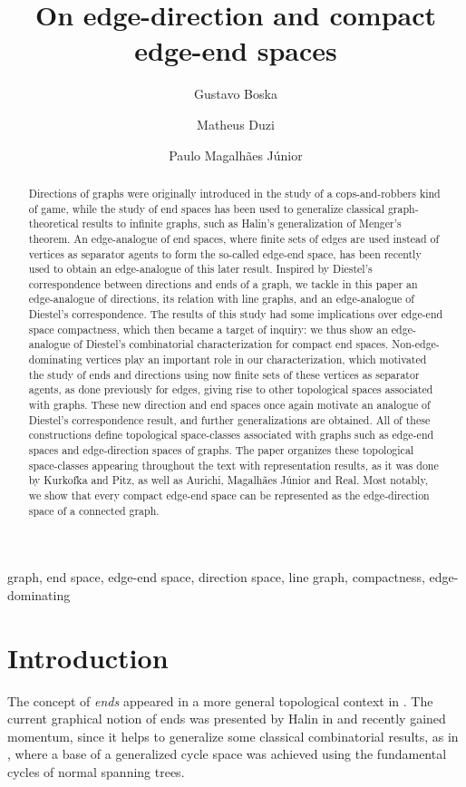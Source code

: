 \documentclass[10pt]{article}
\title{On edge-direction and compact edge-end spaces}
\author{Gustavo Boska \and Matheus Duzi \and Paulo Magalhães Júnior}
\numberwithin{equation}{subsection}
\theoremstyle{remark}
\begin{document}
    
\maketitle
    \begin{abstract}
    
    Directions of graphs were originally introduced in the study of a cops-and-robbers kind of game, while the study of end spaces has been used to generalize classical graph-theoretical results to infinite graphs, such as Halin's generalization of Menger's theorem. An edge-analogue of end spaces, where finite sets of edges are used instead of vertices as separator agents to form the so-called edge-end space, has been recently used to obtain an edge-analogue of this later result. Inspired by Diestel's correspondence between directions and ends of a graph, we tackle in this paper an edge-analogue of directions, its relation with line graphs, and an edge-analogue of Diestel's correspondence. The results of this study had some implications over edge-end space compactness, which then became a target of inquiry: we thus show an edge-analogue of Diestel's combinatorial characterization for compact end spaces. Non-edge-dominating vertices play an important role in our characterization, which motivated the study of ends and directions using now finite sets of these vertices as separator agents, as done previously for edges, giving rise to other topological spaces associated with graphs. These new direction and end spaces once again motivate an analogue of Diestel's correspondence result, and further generalizations are obtained. All of these constructions define topological space-classes associated with graphs such as edge-end spaces and edge-direction spaces of graphs. The paper organizes these topological space-classes appearing throughout the text with representation results, as it was done by Kurkofka and Pitz, as well as Aurichi, Magalhães Júnior and Real. Most notably, we show that every compact edge-end space can be represented as the edge-direction space of a connected graph.

     
    \end{abstract}

    \begin{keywords}
        graph,
        end space,
        edge-end space,
        direction space,
        line graph,
        compactness,
        edge-dominating
    \end{keywords}

    \section{Introduction}
The concept of \emph{ends} appeared in a more general topological context in \cite{Freudenthal1931}. The current graphical notion of ends was presented by Halin in \cite{Halinend} and recently gained momentum, since it helps to generalize some classical combinatorial results, as in \cite{Diestel2004}, where a base of a generalized cycle space was achieved using the fundamental cycles of normal spanning trees. 
\end{document}
